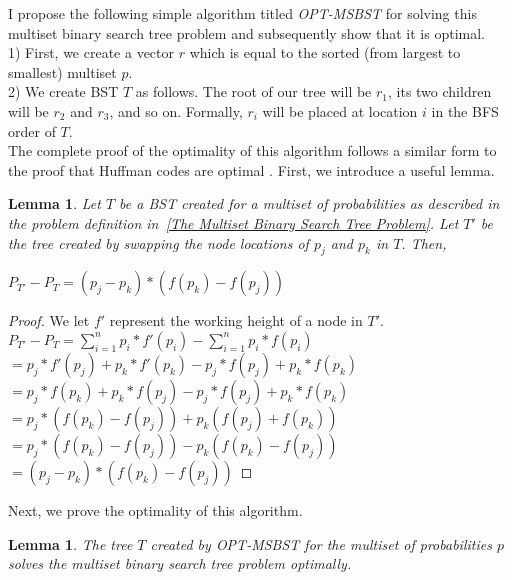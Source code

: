 \documentclass[letterpaper,12pt,titlepage,oneside,final]{book}
\theoremstyle{plain}
\newtheorem{lem}[thm]{Lemma}
\begin{document}
I propose the following simple algorithm titled \textit{OPT-MSBST} for solving this multiset binary search tree problem and subsequently show that it is optimal. \\

1) First, we create a vector $r$ which is equal to the sorted (from largest to smallest) multiset $p$. \\

2) We create BST $T$ as follows. The root of our tree will be $r_1$, its two children will be $r_2$ and $r_3$, and so on. Formally, $r_i$ will be placed at location $i$ in the BFS order of $T$. \\

The complete proof of the optimality of this algorithm follows a similar form to the proof that Huffman codes are optimal \cite{huffman1952method}. First, we introduce a useful lemma.

\begin{lem}\label{MS Swap Lemma}
Let $T$ be a BST created for a multiset of probabilities as described in the problem definition in~\ref{The Multiset Binary Search Tree Problem}. Let $T'$ be the tree created by swapping the node locations of $p_j$ and $p_k$ in $T$. Then,
\begin{center}
$P_{T'}-P_T = (p_j - p_k)*(f(p_k)-f(p_j))$
\end{center}
\end{lem}

\begin{proof}
We let $f'$ represent the working height of a node in $T'$. \\

$P_{T'}-P_T = \sum_{i=1}^{n} p_i*f'(p_i) - \sum_{i=1}^{n} p_i*f(p_i)$ \\
$= p_j*f'(p_j)+p_k*f'(p_k) - p_j*f(p_j)+p_k*f(p_k)$\\
$= p_j*f(p_k)+p_k*f(p_j) - p_j*f(p_j)+p_k*f(p_k)$\\
$= p_j*(f(p_k)-f(p_j)) + p_k (f(p_j) + f(p_k))$\\
$= p_j*(f(p_k)-f(p_j)) - p_k (f(p_k)-f(p_j))$\\
$= (p_j - p_k)*(f(p_k)-f(p_j))$
\end{proof}

Next, we prove the optimality of this algorithm. 

\begin{lem}
The tree $T$ created by \textit{OPT-MSBST} for the multiset of probabilities $p$ solves the multiset binary search tree problem optimally.
\end{lem}
\end{document}
